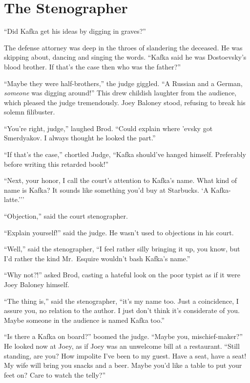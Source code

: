 \documentclass[oneside]{book}
\begin{document}
\chapter{The Stenographer}


``Did Kafka get his ideas by digging in graves?''

The defense attorney was deep in the throes of slandering the
deceased.  He was skipping about,
dancing and singing the words.
``Kafka said he was Dostoevsky's blood brother.
If that's the case then who was the father?''

``Maybe they were half-brothers,'' the judge giggled.  ``A Russian and a German,
\emph{someone} was digging around!''  This drew childish laughter from the
audience, which pleased the judge tremendously.  Joey Baloney stood, refusing to
break his solemn filibuster.

``You're right, judge,'' laughed Brod.  ``Could explain where 'evsky got
Smerdyakov.  I always thought he looked the part.''

``If that's the case,'' chortled Judge, ``Kafka should've hanged himself.  Preferably
before writing this retarded book!''

``Next, your honor, I call the court's attention to Kafka's name.
What kind of name is Kafka?  It sounds like
something you'd buy at Starbucks.  `A
Kafka-latte.{'}''

``Objection,'' said the court stenographer.

``Explain yourself!'' said the judge.  He wasn't used to objections in his court.

``Well,'' said the stenographer, ``I feel rather silly bringing it up, you know,
but I'd rather the kind Mr.~Esquire wouldn't bash Kafka's name.''

``Why not?!'' asked Brod, casting a hateful look on the poor typist as if it were Joey Baloney
himself.

``The thing is,'' said the stenographer, ``it's my name too.  Just a coincidence,
I assure you, no relation to the author.  I just don't think it's considerate
of you.  Maybe someone in the audience is named Kafka too.''

``Is there a Kafka on board?'' boomed the judge.
``Maybe you, mischief-maker?'' He looked now at Joey, as if Joey was an unwelcome bill at a restaurant.
``Still standing, are you?  How impolite I've been to my guest.  Have a seat, have a seat!  My wife will bring you snacks and
a beer.  Maybe you'd like a table to put your feet on?  Care to watch the telly?''
\end{document}
